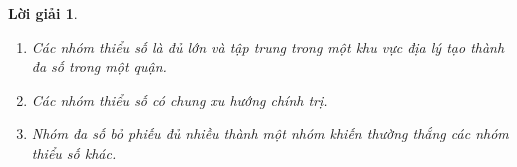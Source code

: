 \documentclass[14pt, a4paper]{article}
\theoremstyle{sltheorem}
\theoremstyle{soltheorem}
\newtheorem*{loigiai}{Lời giải}
\begin{document}
\begin{loigiai}
\begin{enumerate}
    \begin{enumerate}
        \item Các nhóm thiểu số là đủ lớn và tập trung trong một khu vực địa lý tạo thành đa số trong một quận.
        \item Các nhóm thiểu số có chung xu hướng chính trị.
        \item Nhóm đa số bỏ phiếu đủ nhiều thành một nhóm khiến thường thắng các nhóm thiểu số khác.
    \end{enumerate}

    \end{enumerate}
\end{loigiai}


\newpage
\printbibliography[title={TÀI LIỆU THAM KHẢO}]
\end{document}

